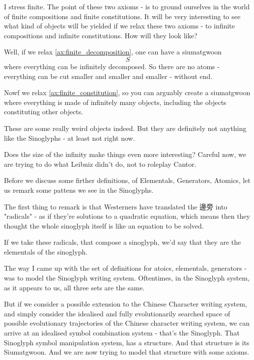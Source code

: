 I stress finite. The point of these two axioms - is to ground ourselves in the world of finite compositions and finite constitutions. It will be very interesting to see what kind of objects will be yielded if we relax these two axioms - to infinite compositions and infinite constitutions. How will they look like? 



Well, if we relax \ref{ax:finite_decomposition}, one can have a siumatgwoon $$S$$ where everything can be infinitely decomposed. So there are no atoms - everything can be cut smaller and smaller and smaller - without end. 

Nowf we relax \ref{ax:finite_constitution}, so you can arguably create a siumatgwoon where everything is made of infinitely many objects, including the objects constituting other objects. 

These are some really weird objects indeed. But they are definitely not anything like the Sinoglyphs - at least not right now. 


Does the size of the infinity make things even more interesting? Careful now, we are trying to do what Leibniz didn't do, not to roleplay Cantor. 

Before we discuss some firther definitions, of Elementals, Generators, Atomics, let us remark some pattens we see in the Sinoglyphs. 

The first thing to remark is that Westerners have translated the 邊旁 into "radicals" - as if they're solutions to a quadratic equation, which means then they thought the whole sinoglyph itself is like an equation to be solved. 

If we take these radicals, that compose a sinoglyph, we'd say that they are the elementals of the sinoglyph. 

The way I came up with the set of definitions for atoics, elementals, generators - was to model the Sinoglyph writing system. Oftentimes, in the Sinoglyph system, as it appears to us, all three sets are the same. 

But if we consider a possible extension to the Chinese Character writing system, and simply consider the idealised and fully evolutionarily searched space of possible evolutionary trajectories of the Chinese character writing system, we can arrive at an idealised symbol combination system - that's the Sinoglyph. That Sinoglyph symbol manipulation system, has a structure. And that structure is its Siumatgwoon. And we are now trying to model that structure with some axioms. 


